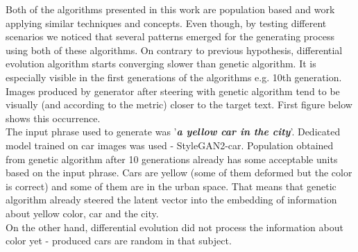 \documentclass[12pt,a4paper,openany]{book}
\begin{document}
\noindent Both of the algorithms presented in this work are population based and work applying similar techniques and concepts. Even though, by testing different scenarios we noticed that several patterns emerged for the generating process using both of these algorithms.  On contrary to previous hypothesis, differential evolution algorithm starts converging slower than genetic algorithm. It is especially visible in the first generations of the algorithms e.g. 10th generation. Images produced by generator after steering with genetic algorithm tend to be visually (and according to the metric) closer to the target text. First figure below shows this occurrence.\\
The input phrase used to generate was '\textit{\textbf{a yellow car in the city}}'. Dedicated model trained on car images was used - StyleGAN2-car. Population obtained from genetic algorithm after 10 generations already has some acceptable units based on the input phrase. Cars are yellow (some of them deformed but the color is correct) and some of them are in the urban space. That means that genetic algorithm already steered the latent vector into the embedding of information about yellow color, car and the city.\\
On the other hand, differential evolution did not process the information about color yet - produced cars are random in that subject.

\newpage
\end{document}
